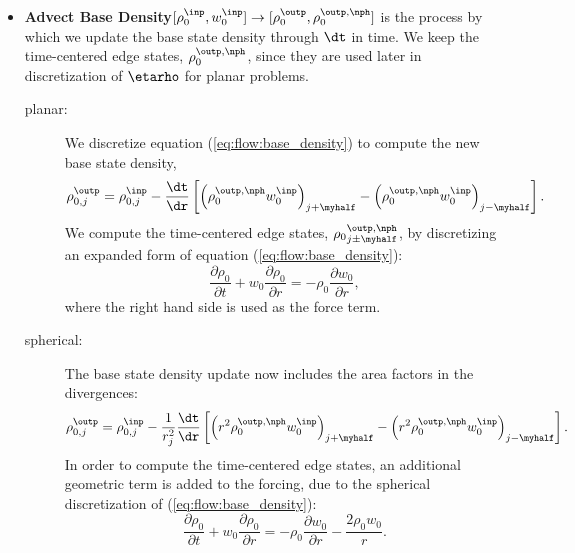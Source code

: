 \begin{itemize}
\item {\bf Advect Base Density}$[\rho_0^\inp,w_0^\inp] \rightarrow
  [\rho_0^\outp, \rho_0^{\outp,\nph}]$ is the process by which we
  update the base state density through $\dt$ in time.  We keep the
  time-centered edge states, $\rho_0^{\outp,\nph}$,
  since they are used later in discretization of $\etarho$ for planar problems.
\begin{description}
\item[planar:] We discretize equation (\ref{eq:flow:base_density}) to
  compute the new base state density,
\begin{equation}
\rho_{0,j}^{\outp} = \rho_{0,j}^{\inp} - \frac{\dt}{\dr} \left [ \left( \rho_0^{\outp,\nph} w_0^{\inp}\right)_{j+\myhalf} - \left( \rho_0^{\outp,\nph} w_0^{\inp}\right)_{j-\myhalf} \right ].
\end{equation}
  We compute the time-centered edge states, ${\rho_0}^{\outp,\nph}_{j\pm\myhalf}$,
  by discretizing an expanded form of equation (\ref{eq:flow:base_density}):
\begin{equation}
\frac{\partial \rho_0}{\partial t} + w_0 \frac{\partial \rho_0}{\partial r} = - \rho_0 \frac{\partial w_0}{\partial r},
\end{equation}
  where the right hand side is used as the force term.
\item[spherical:] The base state density update now includes the area factors in the 
  divergences:
\begin{equation}
\rho_{0,j}^{\outp} = \rho_{0,j}^{\inp} - \frac{1}{r_j^2} \frac{\dt}{\dr} \left [ \left( r^2 \rho_0^{\outp,\nph} w_0^{\inp}\right)_{j+\myhalf} - \left( r^2 \rho_0^{\outp,\nph} w_0^{\inp}\right)_{j-\myhalf} \right].
\end{equation}
  In order to compute the time-centered edge states, an additional geometric 
  term is added to the forcing, due to the spherical discretization of 
  (\ref{eq:flow:base_density}):
\begin{equation}
\frac{\partial \rho_0}{\partial t} + w_0 \frac{\partial \rho_0}{\partial r} = - \rho_0 \frac{\partial w_0}{\partial r} - \frac{2 \rho_0 w_0}{r}.
\end{equation}
\end{description}


\end{itemize}
